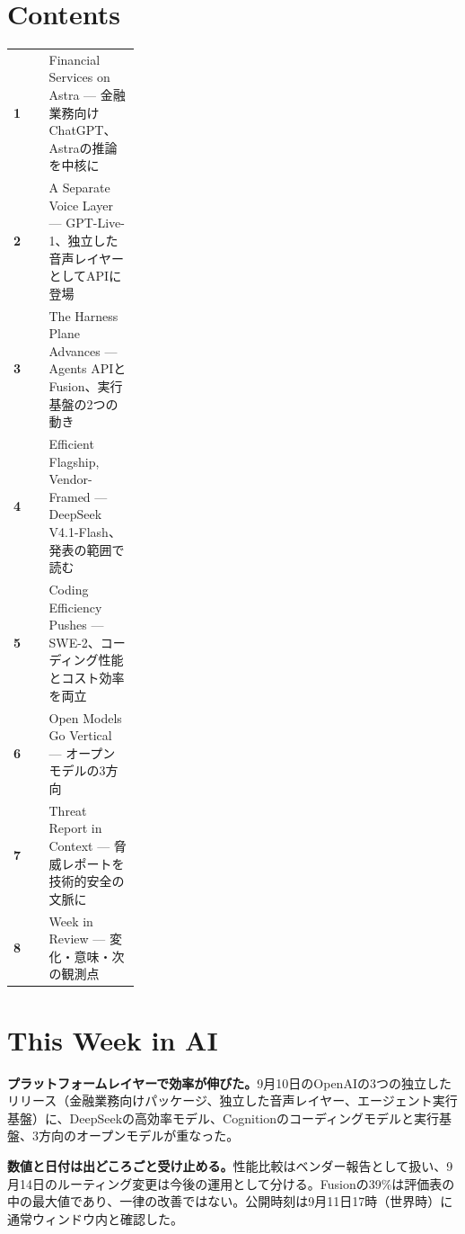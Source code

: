 \section*{Contents}
\begin{tabularx}{0.98\linewidth}{@{}>{\bfseries}p{0.28\linewidth}X@{}}
  1 & Financial Services on Astra --- 金融業務向けChatGPT、Astraの推論を中核に \\
  2 & A Separate Voice Layer --- GPT-Live-1、独立した音声レイヤーとしてAPIに登場 \\
  3 & The Harness Plane Advances --- Agents APIとFusion、実行基盤の2つの動き \\
  4 & Efficient Flagship, Vendor-Framed --- DeepSeek V4.1-Flash、発表の範囲で読む \\
  5 & Coding Efficiency Pushes --- SWE-2、コーディング性能とコスト効率を両立 \\
  6 & Open Models Go Vertical --- オープンモデルの3方向 \\
  7 & Threat Report in Context --- 脅威レポートを技術的安全の文脈に \\
  8 & Week in Review --- 変化・意味・次の観測点 \\
\end{tabularx}

\vspace{4mm}
\section*{This Week in AI}

\begin{tcolorbox}[enhanced,colback=SurveySoft,colframe=SurveyRule,boxrule=0.4pt,arc=1mm,left=3mm,right=3mm,top=2mm,bottom=2mm]
\textbf{プラットフォームレイヤーで効率が伸びた。}\quad 9月10日のOpenAIの3つの独立したリリース（金融業務向けパッケージ、独立した音声レイヤー、エージェント実行基盤）に、DeepSeekの高効率モデル、Cognitionのコーディングモデルと実行基盤、3方向のオープンモデルが重なった。
\end{tcolorbox}

\begin{tcolorbox}[enhanced,colback=SurveySoft,colframe=SurveyRule,boxrule=0.4pt,arc=1mm,left=3mm,right=3mm,top=2mm,bottom=2mm]
\textbf{数値と日付は出どころごと受け止める。}\quad 性能比較はベンダー報告として扱い、9月14日のルーティング変更は今後の運用として分ける。Fusionの39\%は評価表の中の最大値であり、一律の改善ではない。公開時刻は9月11日17時（世界時）に通常ウィンドウ内と確認した。
\end{tcolorbox}

